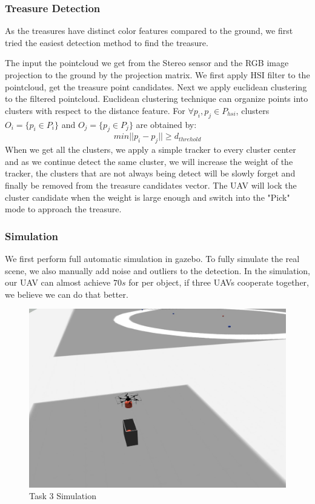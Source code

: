 \documentclass{standalone}
\begin{document}
\subsubsection{Treasure Detection}
As the treasures have distinct color features compared to the ground, we first tried the easiest detection method to find the treasure. 

The input the pointcloud we get from the Stereo sensor and the RGB image projection to the ground by the projection matrix. We first apply HSI filter to the pointcloud, get the treasure point candidates. Next we apply euclidean clustering to the filtered pointcloud. Euclidean clustering technique can organize points into clusters with respect to the distance feature. For $\forall p_i, p_j \in P_{hsi}$, clusters $O_i = \{p_i \in P_i\}$ and $O_j = \{p_j \in P_j\}$ are obtained by:
\begin{equation}\label{eq3-1}
min||p_i - p_j|| \geq d_{threhold} 
\end{equation}
When we get all the clusters, we apply a simple tracker to every cluster center and as we continue detect the same cluster, we will increase the weight of the tracker, the clusters that are not always being detect will be slowly forget and finally be removed from the treasure candidates vector. The UAV will lock the cluster candidate when the weight is large enough and switch into the "Pick" mode to approach the treasure.

\subsubsection{Simulation}
We first perform full automatic simulation in gazebo. To fully simulate the real scene, we also manually add noise and outliers to the detection. In the simulation, our UAV can almost achieve $70s$ for per object, if three UAVs cooperate together, we believe we can do that better.

\begin{figure}%
  \begin{center}
    \includegraphics[keepaspectratio=true, width=1\linewidth, height=0.20\textheight]{img//t3simu.jpg}
  \end{center}
  \caption{Task 3 Simulation}
  \label{t3state}
\end{figure}
\end{document}
